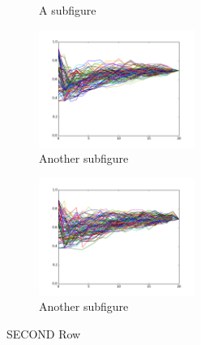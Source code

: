 \documentclass[11pt]{scrartcl}
\begin{document}
\begin{figure}
\begin{subfigure}[b]{.3\linewidth}
		\caption{A subfigure}\label{fig:1a}
	\end{subfigure}
	\begin{subfigure}[b]{.3\linewidth}
		\centering
		\includegraphics[width=2.0in, height=1.5in]{neighbor_p(edge=1|obs=1)_advice_shuffles.png}
		\caption{Another subfigure}\label{fig:1b}
	\end{subfigure}
	\begin{subfigure}[b]{.3\linewidth}
		\centering
		\includegraphics[width=2.0in, height=1.5in]     {block_p(edge=1|obs=1)_advice_shuffles.png}
		\caption{Another subfigure}\label{fig:1c}
	\end{subfigure}
	\caption{SECOND Row}
	
\end{figure}
\end{document}
